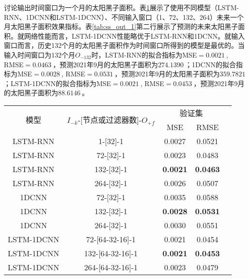 讨论输出时间窗口为一个月的太阳黑子面积。表\ref{tab:ss_area_out_1}展示了使用不同模型（LSTM-RNN、1DCNN和LSTM-1DCNN）、不同输入窗口（1、72、132、264）未来一个月太阳黑子面积效果指标。表\ref{tab:ss_out_1}第二行展示了预测的未来太阳黑子面积。就网络性能而言，LSTM-1DCNN性能略优于LSTM-RNN和1DCNN。就输入窗口而言，历史132个月的太阳黑子面积作为时间窗口所得到的模型是最优的。当输入时间窗口为132个月$O_{-132}$时，LSTM-RNN的拟合指标为MSE$=\SI{0.0021}{}$, RMSE$=\SI{0.0463}{}$，预测2021年9月的太阳黑子面积为$\SI{274.1390}{}$；1DCNN的拟合指标为MSE$=\SI{0.0028}{}$, RMSE$=\SI{0.0531}{}$，预测2021年9月的太阳黑子面积为$\SI{359.7821}{}$；LSTM-1DCNN的拟合指标为MSE$=\SI{0.0021}{}$, RMSE$=\SI{0.0453}{}$，预测2021年9月的太阳黑子面积为$\SI{88.6146}{}$。

\begin{table}[!htbp]
  \centering
  \label{tab:ss_area_out_1}
  \footnotesize
  \renewcommand{\arraystretch}{1}
  \begin{tabular}{ccccc}
    \toprule
    \multirow{2}{*}{模型} & \multirow{2}{*}{$I_{-k}$-[节点或过滤器数]-$O_{+f}$} & \multicolumn{2}{c}{验证集}\\
    \cmidrule(lr){3-4}
    \noalign{\smallskip}
    & & MSE & RMSE\\
    \midrule 
    LSTM-RNN & 1-[32]-1 & 0.0027 & 0.0521 \\
    LSTM-RNN & 72-[32]-1 & 0.0023 & 0.0483 \\
    LSTM-RNN & 132-[32]-1 & \textbf{0.0021} & \textbf{0.0463} \\
    LSTM-RNN & 264-[32]-1 & 0.0026 & 0.0507 \\
    \hline
    1DCNN & 72-[32]-1 & 0.0035 & 0.0588 \\
    1DCNN & 132-[32]-1 & \textbf{0.0028} & \textbf{0.0531} \\
    1DCNN & 264-[32]-1 & 0.0030 & 0.0551 \\
    \hline
    LSTM-1DCNN & 72-[64-32-16]-1 & 0.0021 & 0.0454 \\
    LSTM-1DCNN & 132-[64-32-16]-1 & \textbf{0.0021} & \textbf{0.0453} \\
    LSTM-1DCNN & 264-[64-32-16]-1 & 0.0023 & 0.0479 \\
    \bottomrule
\end{tabular}
\end{table}

